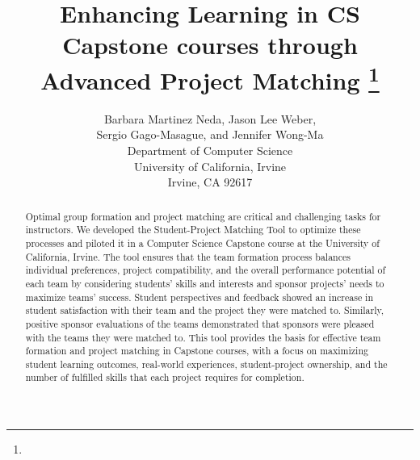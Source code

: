 \documentclass{article}
\title{Enhancing  Learning in CS Capstone courses through Advanced Project Matching \footnote{\protect}
}
\author{
Barbara Martinez Neda, Jason Lee Weber,\\ Sergio Gago-Masague, and Jennifer Wong-Ma\\
Department of Computer Science\\
University of California, Irvine\\
Irvine, CA 92617\\
\email{\{barbarm,weberjl,sgagomas,jwongma\}@uci.edu}}
\begin{document}
\maketitle

\begin{abstract}

Optimal group formation and project matching are critical and challenging tasks for instructors.
We developed the Student-Project Matching Tool to optimize these processes and piloted it in a Computer Science Capstone course at the University of California, Irvine. The tool ensures that the team formation process balances individual preferences, project compatibility, and the overall performance potential of each team by considering students' skills and interests and sponsor projects' needs to maximize teams' success.
Student perspectives and feedback showed an increase in student satisfaction with their team and the project they were matched to. Similarly, positive sponsor evaluations of the teams demonstrated that sponsors were pleased with the teams they were matched to.
This tool provides the basis for effective team formation and project matching in Capstone courses, with a focus on maximizing student learning outcomes, real-world experiences, student-project ownership, and the number of fulfilled skills that each project requires for completion.


\end{abstract}










\medskip

\printbibliography
\end{document}
